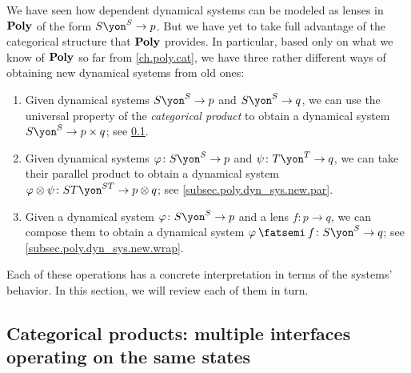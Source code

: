 \documentclass[Book-Poly]{subfiles}
\begin{document}
We have seen how dependent dynamical systems can be modeled as lenses in $\mathbf{Poly}$ of the form $S\yon^S\to p$.
But we have yet to take full advantage of the categorical structure that $\mathbf{Poly}$ provides.
In particular, based only on what we know of $\mathbf{Poly}$ so far from \cref{ch.poly.cat}, we have three rather different ways of obtaining new dynamical systems from old ones:
\begin{enumerate}
    \item Given dynamical systems $S\yon^S\to p$ and $S\yon^S\to q$, we can use the universal property of the \emph{categorical product} to obtain a dynamical system $S\yon^S\to p\times q$; see \cref{subsec.poly.dyn_sys.new.prod}.
    \item Given dynamical systems $\varphi\colon S\yon^S\to p$ and $\psi\colon T\yon^T\to q$, we can take their parallel product to obtain a dynamical system $\varphi\otimes\psi\colon ST\yon^{ST}\to p\otimes q$; see \cref{subsec.poly.dyn_sys.new.par}.
    \item Given a dynamical system $\varphi\colon S\yon^S\to p$ and a lens $f\colon p\to q$, we can compose them to obtain a dynamical system $\varphi\then f\colon S\yon^S\to q$; see \cref{subsec.poly.dyn_sys.new.wrap}.
\end{enumerate}
Each of these operations has a concrete interpretation in terms of the systems' behavior.
In this section, we will review each of them in turn.

\subsection{Categorical products: multiple interfaces operating on the same states}\label{subsec.poly.dyn_sys.new.prod}


\end{document}
